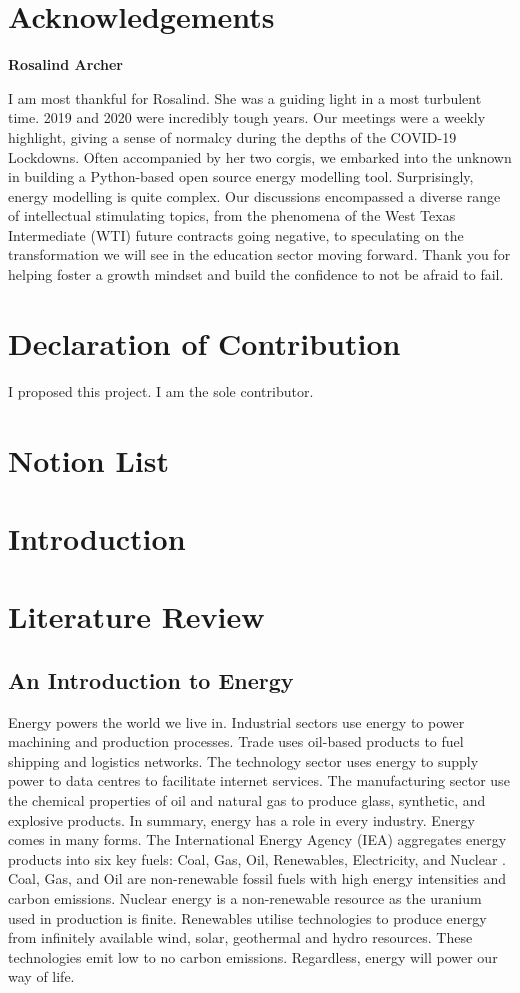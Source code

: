 \documentclass[12pt]{article}
\begin{document}
\section*{Acknowledgements}
\begin{center}
	\textbf{Rosalind Archer}
\end{center}
I am most thankful for Rosalind. She was a guiding light in a most turbulent time.
2019 and 2020 were incredibly tough years.
Our meetings were a weekly highlight, giving a sense of normalcy during the depths of the COVID-19 Lockdowns.
Often accompanied by her two corgis, we embarked into the unknown in building a Python-based open source energy modelling tool.
Surprisingly, energy modelling is quite complex.
Our discussions encompassed a diverse range of intellectual stimulating topics, 
from the phenomena of the West Texas Intermediate (WTI) future contracts going negative,
to speculating on the transformation we will see in the education sector moving forward.
Thank you for helping foster a growth mindset and build the confidence to not be afraid to fail.

\newpage
\section*{Declaration of Contribution}
I proposed this project. I am the sole contributor.

\newpage
\tableofcontents
\newpage
\section*{Notion List}
\newpage
\listoffigures
\listoftables
\newpage
\section{Introduction}
\section{Literature Review}
\subsection{An Introduction to Energy}
	Energy powers the world we live in.
Industrial sectors use energy to power machining and production processes. Trade uses oil-based products to fuel shipping and logistics networks. 
The technology sector uses energy to supply power to data centres to facilitate internet services. The manufacturing sector use the chemical properties of oil and natural gas to produce glass, synthetic, and explosive products. 
In summary, energy has a role in every industry. Energy comes in many forms. 
The International Energy Agency (IEA) aggregates energy products into six key fuels: Coal, Gas, Oil, Renewables, Electricity, and Nuclear \cite{W:2}. 
Coal, Gas, and Oil are non-renewable fossil fuels with high energy intensities and carbon emissions. 
Nuclear energy is a non-renewable resource as the uranium used in production is finite. 
Renewables utilise technologies to produce energy from infinitely available wind, solar, geothermal and hydro resources. 
These technologies emit low to no carbon emissions. 
Regardless, energy will power our way of life.
\end{document}
